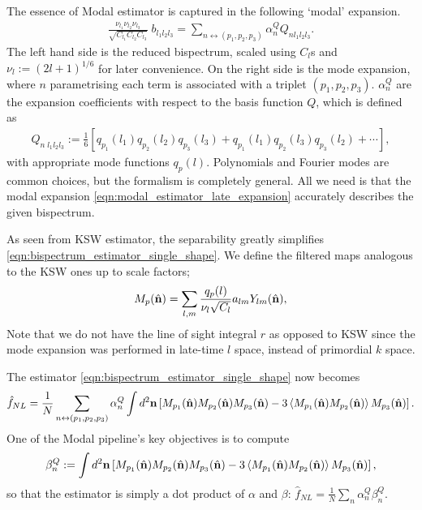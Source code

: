 The essence of Modal estimator is captured in the following `modal' expansion.
\begin{align}
	\frac{\nu_{l_1} \nu_{l_2} \nu_{l_3}}{\sqrt{C_{l_1} C_{l_2} C_{l_3}}} \; b_{l_1 l_2 l_3} = \sum_{n \leftrightarrow (p_1,p_2,p_3)} \alpha_n^Q Q_{n l_1 l_2 l_3}. \label{eqn:modal_estimator_late_expansion}
\end{align}
The left hand side is the reduced bispectrum, scaled using $C_l$s and $\nu_l := (2l+1)^{1/6}$ for later convenience. On the right side is the mode expansion, where $n$ parametrising each term is associated with a triplet $(p_1,p_2,p_3)$. $\alpha_n^Q$ are the expansion coefficients with respect to the basis function $Q$, which is defined as
\begin{align}
	Q_{n \; l_1 l_2 l_3} := \frac{1}{6} \left[ q_{p_1}(l_1) q_{p_2}(l_2) q_{p_3}(l_3) + q_{p_1}(l_1) q_{p_2}(l_3) q_{p_3}(l_2) + \cdots \right],
\end{align}
with appropriate mode functions $q_p(l)$. Polynomials and Fourier modes are common choices, but the formalism is completely general. All we need is that the modal expansion \eqref{eqn:modal_estimator_late_expansion} accurately describes the given bispectrum.

As seen from KSW estimator, the separability greatly simplifies \eqref{eqn:bispectrum_estimator_single_shape}. We define the filtered maps analogous to the KSW ones up to scale factors;
\begin{align}
	M_p (\hat{\mathbf{n}}) = \sum_{l,m} \frac{q_p(l)}{\nu_l \sqrt{C_l}} a_{lm} Y_{lm}(\hat{\mathbf{n}}), \label{eqn:modal_estimator_filtered_map}
\end{align}
Note that we do not have the line of sight integral $r$ as opposed to KSW since the mode expansion was performed in late-time $l$ space, instead of primordial $k$ space.

The estimator \eqref{eqn:bispectrum_estimator_single_shape} now becomes
\begin{align}
	\hat{f}_{NL} = \frac{1}{N} \sum_{n \newline \leftrightarrow (p_1,p_2,p_3)} \alpha_n^Q \int d^2 \vv{n} \left[ M_{p_1}(\hat{\vv{n}}) M_{p_2}(\hat{\vv{n}}) M_{p_3}(\hat{\vv{n}}) - 3 \left< M_{p_1}(\hat{\vv{n}}) M_{p_2}(\hat{\vv{n}}) \right> M_{p_3}(\hat{\vv{n}})  \right].
\end{align}
One of the Modal pipeline's key objectives is to compute
\begin{align}
	\beta^Q_n := \int d^2 \mathbf{n} \left[ M_{p_1}(\hat{\mathbf{n}}) M_{p_2}(\hat{\mathbf{n}}) M_{p_3}(\hat{\mathbf{n}}) - 3 \left< M_{p_1}(\hat{\mathbf{n}}) M_{p_2}(\hat{\mathbf{n}}) \right> M_{p_3}(\hat{\mathbf{n}})  \right], \label{def:modal_estimator_beta}
\end{align}
so that the estimator is simply a dot product of $\alpha$ and $\beta$: $\hat{f}_{NL} = \frac{1}{N} \sum_n \alpha^Q_n \beta^Q_n$.

